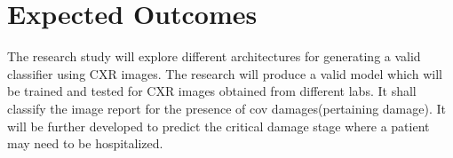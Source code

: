 \section{Expected Outcomes}

The research study will explore different architectures for generating a valid classifier using CXR images. The research will produce a valid model which will be trained and tested for CXR images obtained from different labs. It shall classify the image report for the presence of \acrfull{cov} damages(pertaining damage). It will be further developed to predict the critical damage stage where a patient may need to be hospitalized.